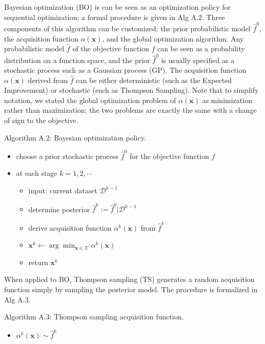 \documentclass{article}
\begin{document}
Bayesian optimization (BO) is can be seen as an optimization policy for
sequential optimization; a formal procedure is given in Alg A.2. Three
components of this algorithm can be customized: the prior probabilistic
model $\widehat{f}^0$, the acquisition function
$\alpha(\mathbf{x})$, and the global optimization algorithm. Any
probabilistic model $\widehat{f}$ of the objective function $f$ can
be seen as a probability distribution on a function space, and the prior
$\widehat{f}^0$ is usually specified as a stochastic process such as a
Gaussian process (GP). The acquisition function $\alpha(\mathbf{x})$
derived from $\widehat{f}$ can be either deterministic (such as the
Expected Improvement) or stochastic (such as Thompson Sampling). Note
that to simplify notation, we stated the global optimization problem of
$\alpha(\mathbf{x})$ as minimization rather than maximization; the two
problems are exactly the same with a change of sign to the objective.

Algorithm A.2: Bayesian optimization policy.

\begin{itemize}

\item
  choose a prior stochastic process $\widehat{f}^0$ for the objective
  function $f$
\item
  at each stage $k = 1, 2, \cdots$

  \begin{itemize}
  
  \item
    input: current dataset $\mathcal{D}^{k-1}$
  \item
    determine posterior
    $\widehat{f}^k := \widehat{f}^0 | \mathcal{D}^{k-1}$
  \item
    derive acquisition function $\alpha^k(\mathbf{x})$ from
    $\widehat{f}^k$
  \item
    $\mathbf{x}^k \gets \arg\min_{\mathbf{x} \in \mathcal{X}} \alpha^k(\mathbf{x})$
  \item
    return $\mathbf{x}^k$
  \end{itemize}
\end{itemize}

When applied to BO, Thompson sampling (TS) generates a random
acquisition function simply by sampling the posterior model. The
procedure is formalized in Alg A.3.

Algorithm A.3: Thompson sampling acquisition function.

\begin{itemize}

\item
  $\alpha^k(\mathbf{x}) \sim \widehat{f}^k$
\end{itemize}
\end{document}
